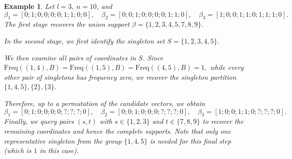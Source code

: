 \documentclass[10pt,a4paper]{amsart}
\newcommand{\xl}[1]{{\color{blue}#1}}
\newtheorem{example}{Example}[section]
\begin{document}

\begin{example}
Let $l=3$, $n=10$, and
\[
\beta_1=[0;1;0;0;0;0;1;1;0;0],\quad
\beta_2=[0;0;1;0;0;0;0;1;1;0],\quad
\beta_3=[1;0;0;1;1;0;1;1;1;0].
\]
The first stage recovers the union support
\(
\beta=\{1,2,3,4,5,7,8,9\}.
\)

In the second stage, we first identify the singleton set
\(
S=\{1,2,3,4,5\}.
\)

We then examine all pairs of coordinates in $S$. Since
\(
\mathrm{Freq}((1,4),B)
=\mathrm{Freq}((1,5),B)
=\mathrm{Freq}((4,5),B)=1,
\)
while every other pair of singletons has frequency zero, we recover the singleton partition
\(
\{1,4,5\},\{2\},\{3\}.
\)

Therefore, up to a permutation of the candidate vectors, we obtain
\[
\beta_1=[0;1;0;0;0;0;?;?;?;0],\quad
\beta_2=[0;0;1;0;0;0;?;?;?;0],\quad
\beta_3=[1;0;0;1;1;0;?;?;?;0].
\]
Finally, we query pairs $(s,t)$ with $s\in\{1,2,3\}$ and $t\in\{7,8,9\}$ to recover the remaining coordinates and hence the complete supports. Note that only one representative singleton from the group $\{1,4,5\}$ is needed for this final step (which is $1$ in this case).
\end{example}
\end{document}
